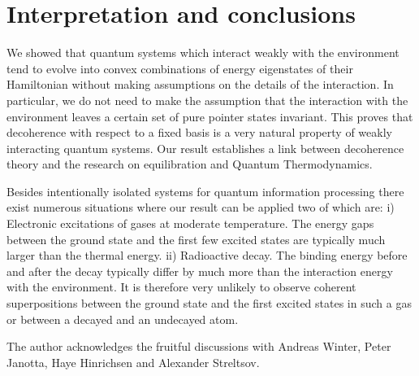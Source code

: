 \documentclass[aps,prl,twocolumn,showpacs,showkeys,a4paper]{revtex4}
\begin{document}
\section{Interpretation and conclusions}
\label{sec:conclusions}
%
We showed that quantum systems which interact weakly with the environment tend to evolve into convex combinations of energy eigenstates of their Hamiltonian without making assumptions on the details of the interaction.
In particular, we do not need to make the assumption that the interaction with the environment leaves a certain set of pure pointer states invariant.
This proves that decoherence with respect to a fixed basis is a very natural property of weakly interacting quantum systems.
Our result establishes a link between decoherence theory and the research on equilibration and Quantum Thermodynamics.

Besides intentionally isolated systems for quantum information processing there exist numerous situations where our result can be applied two of which are:
i) Electronic excitations of gases at moderate temperature.
The energy gaps between the ground state and the first few excited states are typically much larger than the thermal energy.
ii) Radioactive decay.
The binding energy before and after the decay typically differ by much more than the interaction energy with the environment.
It is therefore very unlikely to observe coherent superpositions between the ground state and the first excited states in such a gas or between a decayed and an undecayed atom.

The author acknowledges the fruitful discussions with Andreas Winter, Peter Janotta, Haye Hinrichsen and Alexander Streltsov.



%
%
%
%
%
\end{document}
